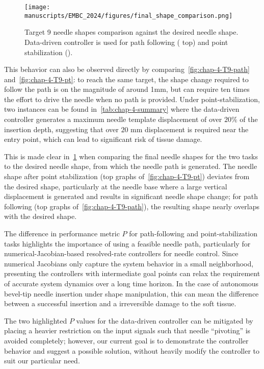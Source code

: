 \begin{figure}[h]
  \centering
  \texttt{[image: manuscripts/EMBC\_2024/figures/final\_shape\_comparison.png]}
  \caption{Target 9 needle shapes comparison against the desired needle shape. Data-driven controller is used for path following ( top) and point stabilization ().}
  \label{fig:chap-4-final-shape-comparison}
\end{figure}

This behavior can also be observed directly by comparing~\cref{fig:chap-4-T9-path} and~\ref{fig:chap-4-T9-pt}: to reach the same target, the shape change required to follow the path is on the magnitude of around 1mm, but can require ten times the effort to drive the needle when no path is provided. Under point-stabilization, two instances can be found in~\cref{tab:chap-4-summary} where the data-driven controller generates a maximum needle template displacement of over $20\%$ of the insertion depth, suggesting that over $20$ mm displacement is required near the entry point, which can lead to significant risk of tissue damage.

This is made clear in~\ref{fig:chap-4-final-shape-comparison} when comparing the final needle shapes for the two tasks to the desired needle shape, from which the needle path is generated. The needle shape after point stabilization (top graphs of~\cref{fig:chap-4-T9-pt}) deviates from the desired shape, particularly at the needle base where a large vertical displacement is generated and results in significant needle shape change; for path following (top graphs of~\cref{fig:chap-4-T9-path}), the resulting shape nearly overlaps with the desired shape.

The difference in performance metric $P$ for path-following and point-stabilization tasks highlights the importance of using a feasible needle path, particularly for numerical-Jacobian-based resolved-rate controllers for needle control. Since numerical Jacobians only capture the system behavior in a small neighborhood, presenting the controllers with intermediate goal points can relax the requirement of accurate system dynamics over a long time horizon. In the case of autonomous bevel-tip needle insertion under shape manipulation, this can mean the difference between a successful insertion and a irreversible damage to the soft tissue.

The two highlighted $P$ values for the data-driven controller can be mitigated by placing a heavier restriction on the input signals such that needle ``pivoting'' is avoided completely; however, our current goal is to demonstrate the controller behavior and suggest a possible solution, without heavily modify the controller to suit our particular need.


